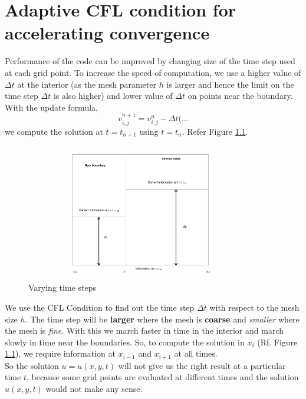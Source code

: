 \documentclass[11pt]{report}
\begin{document}
\chapter{Adaptive CFL condition for accelerating convergence}
Performance of the code can be improved by changing size of the time step used at each grid point. To increase the speed of computation, we use a higher value of $\Delta t$ at the interior (as the mesh parameter $h$ is larger and hence the limit on the time step $\Delta t$ is also higher) and lower value of $\Delta t$ on points near the boundary.\\

\noindent
With the update formula, 
\begin{equation}
	v_{i,j}^{n+1} = v_{i,j}^n - \Delta t (\dots
\end{equation}
we compute the solution at $t = t_{n+1}$  using $t = t_n$. Refer Figure \ref{fig:8}.\\
\begin{figure}[h!]
	\centering
	\includegraphics[width = 10cm, height = 6cm]{improv.png}
	\caption{Varying time steps}
	\label{fig:8}
\end{figure}

\noindent
We use the CFL Condition to find out the time step $\Delta t$ with respect to the mesh size $h$. The time step will be \textbf{larger} where the mesh is \textbf{coarse} and \textit{smaller} where the mesh is \textit{fine}. With this we march faster in time in the interior and march slowly in time near the boundaries. So, to compute the solution in $x_i$ (Rf. Figure \ref{fig:8}), we require information at $x_{i-1}$ and $x_{i+1}$ at all times.\\

\noindent
So the solution $u = u(x,y,t)$ will not give us the right result at a particular time $t$, because some grid points are evaluated at different times and the solution $u(x,y,t)$ would not make any sense. \\
\end{document}
